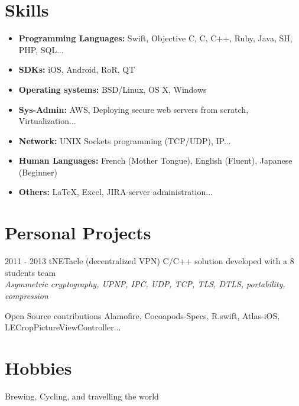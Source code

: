 \documentclass[]{template/friggeri-cv} %
\begin{document}

\section{Skills}

\begin{itemize}
\item \textbf{Programming Languages:} Swift, Objective C, C, C++, Ruby, Java, SH, PHP, SQL...
\item \textbf{SDKs:} iOS, Android, RoR, QT
\item \textbf{Operating systems:} BSD/Linux, OS X, Windows
\item \textbf{Sys-Admin:} AWS, Deploying secure web servers from scratch, Virtualization...
\item \textbf{Network:} UNIX Sockets programming (TCP/UDP), IP...
\item \textbf{Human Languages:} French (Mother Tongue), English (Fluent), Japanese (Beginner)
\item \textbf{Others:} \LaTeX, Excel, JIRA-server administration...
\end{itemize}


\section{Personal Projects}
\begin{entrylist}
  \entry
      {2011 - 2013}
      {tNETacle (decentralized VPN)}
      {}
      {C/C++ solution developed with a 8 students team \\
      \emph{Asymmetric cryptography, UPNP, IPC, UDP, TCP, TLS, DTLS, portability, compression}}

\entry
{}
{Open Source contributions}
{}
{Alamofire, Cocoapods-Specs, R.swift, Atlas-iOS, LECropPictureViewController...}


\end{entrylist}


\section{Hobbies}

{Brewing, Cycling, and travelling the world}
\end{document}
